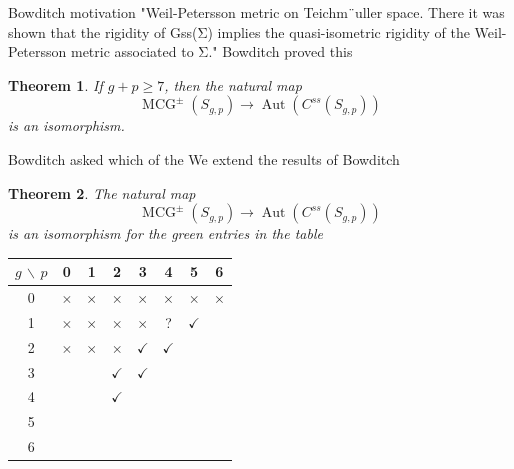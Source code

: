 \documentclass[11pt]{article}
\DeclareMathOperator{\mcg}{MCG}
\DeclareMathOperator{\aaut}{Aut}
\newtheorem{theorem}{Theorem}
\theoremstyle{remark}
\theoremstyle{definition}
\begin{document}
Bowditch motivation
"Weil-Petersson metric on Teichm¨uller space. There
it was shown that the rigidity of Gss(Σ) implies the quasi-isometric
rigidity of the Weil-Petersson metric associated to Σ."
Bowditch proved this \cite{bowditch}



\begin{theorem}
  \label{thm:bowditch}
 If $g+p\geq 7$, then
 the natural map
 $$\mcg^\pm \left ( S_{g,p} \right ) \to \aaut \left ( C^{ss}(S_{g,p}) \right )$$
 is an isomorphism.
\end{theorem}

Bowditch asked which of the
We extend the results of Bowditch


\begin{theorem}
  \label{thm:css}
The natural map
 $$\mcg^\pm \left ( S_{g,p} \right ) \to \aaut \left ( C^{ss}(S_{g,p}) \right )$$
 is an isomorphism for the green entries in the table
\end{theorem}

\begin{tabular}{ | c | c| c| c| c| c| c|c| }
  \hline
  $g$ $\backslash$ $p$ & 0 & 1 & 2 & 3 & 4 & 5 & 6  \\
  \hline
  0 & {\color{red}$\times$} & {\color{red}$\times$} & {\color{red}$\times$} & {\color{red}$\times$} & {\color{red}$\times$} & {\color{red}$\times$} & {\color{red}$\times$} \\
  \hline
  1 & {\color{red}$\times$} & {\color{red}$\times$} & {\color{red}$\times$} & {\color{red}$\times$} & ? & {\color{green}$\checkmark$}  & \cite{bowditch} \\
  \hline
  2 & {\color{red}$\times$} & {\color{red}$\times$} & {\color{red}$\times$} &  {\color{green}$\checkmark$} & {\color{green}$\checkmark$} & \cite{bowditch}  & \cite{bowditch} \\
  \hline
  3 & \cite{commensurations} &\cite{kida} & {\color{green}$\checkmark$} & {\color{green}$\checkmark$} &\cite{bowditch}& \cite{bowditch}&\cite{bowditch} \\
  \hline
  4 & \cite{commensurations} &\cite{kida}& {\color{green}$\checkmark$}  & \cite{bowditch}&\cite{bowditch}&\cite{bowditch}&\cite{bowditch} \\
  \hline
  5 & \cite{commensurations} &\cite{kida}&\cite{bowditch}&\cite{bowditch}&\cite{bowditch}&\cite{bowditch}&\cite{bowditch} \\
  \hline
  6 & \cite{commensurations} &\cite{kida}& \cite{bowditch} & \cite{bowditch}& \cite{bowditch}& \cite{bowditch} & \cite{bowditch} \\
  \hline
\end{tabular}
\end{document}
